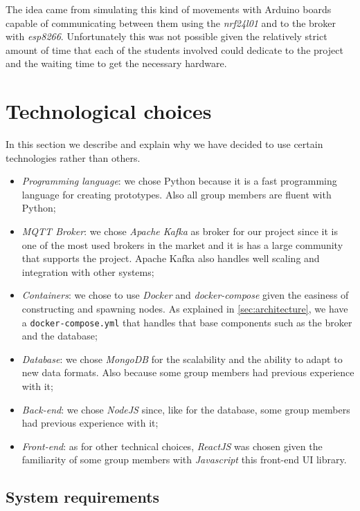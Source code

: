 \documentclass[conference]{IEEEtran}
\begin{document}
	The idea came from simulating this kind of movements with Arduino boards capable of communicating between them using the \textit{nrf24l01} and to the broker with \textit{esp8266}.
	Unfortunately this was not possible given the relatively strict amount of time that each of the students involved could dedicate to the project and the waiting time to get the necessary hardware.

\section{Technological choices}\label{sec:technological_choices}

	In this section we describe and explain why we have decided to use certain technologies rather than others.
	
	\begin{itemize}
		\item \textit{Programming language}: we chose Python because it is a fast programming language for creating prototypes. Also all group members are fluent with Python;
		\item \textit{MQTT Broker}: we chose \textit{Apache Kafka} as broker for our project since it is one of the most used brokers in the market and it is has a large community that supports the project. Apache Kafka also handles well scaling and integration with other systems;
		\item \textit{Containers}: we chose to use \textit{Docker} and \textit{docker-compose} given the easiness of constructing and spawning nodes. As explained in \ref{sec:architecture}, we have a \texttt{docker-compose.yml} that handles that base components such as the broker and the database;
		\item \textit{Database}: we chose \textit{MongoDB} for the scalability and the ability to adapt to new data formats. Also because some group members had previous experience with it;
		\item \textit{Back-end}: we chose \textit{NodeJS} since, like for the database, some group members had previous experience with it;
		\item \textit{Front-end}: as for other technical choices, \textit{ReactJS} was chosen given the familiarity of some group members with \textit{Javascript} this front-end UI library.
	\end{itemize}

	\subsection{System requirements}
	
\end{document}
